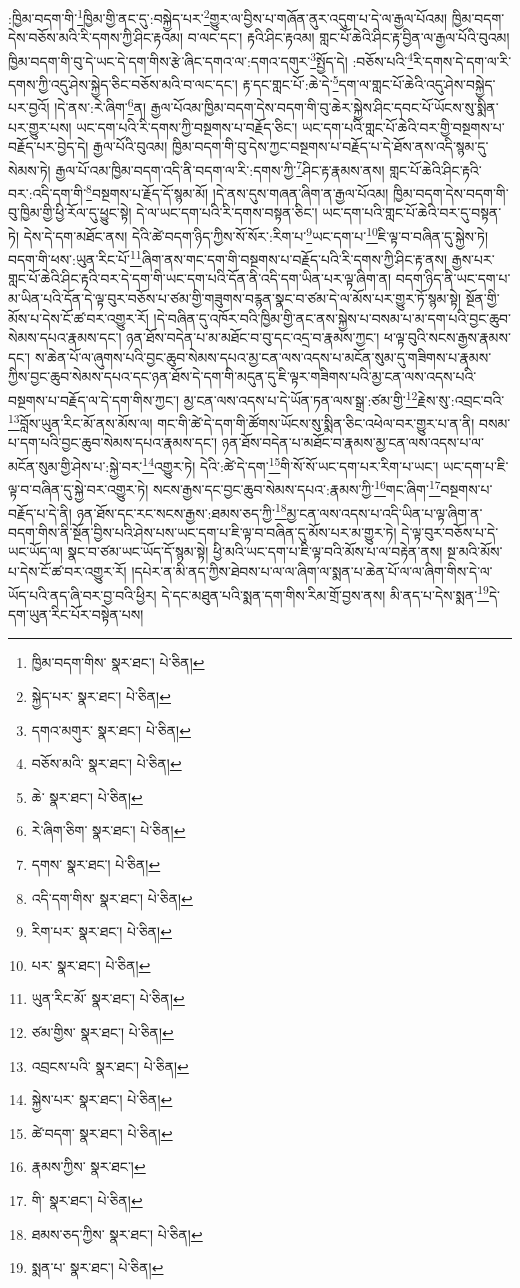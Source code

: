 :ཁྱིམ་བདག་གི་\footnote{ཁྱིམ་བདག་གིས་  སྣར་ཐང་།  པེ་ཅིན། }ཁྱིམ་གྱི་ནང་དུ་:བསྐྱེད་པར་\footnote{སྐྱེད་པར་  སྣར་ཐང་།  པེ་ཅིན། }གྱུར་ལ་བྱིས་པ་གཞོན་ནུར་འདུག་པ་དེ་ལ་རྒྱལ་པོའམ། ཁྱིམ་བདག་དེས་བཅོས་མའི་རི་དགས་ཀྱི་ཤིང་རྟའམ། བ་ལང་དང་། རྟའི་ཤིང་རྟའམ། གླང་པོ་ཆེའི་ཤིང་རྟ་བྱིན་ལ་རྒྱལ་པོའི་བུའམ། ཁྱིམ་བདག་གི་བུ་དེ་ཡང་དེ་དག་གིས་རྩེ་ཞིང་དགའ་ལ་:དགའ་དགུར་\footnote{དགའ་མགུར་  སྣར་ཐང་།  པེ་ཅིན། }སྤྱོད་དེ། :བཅོས་པའི་\footnote{བཅོས་མའི་  སྣར་ཐང་།  པེ་ཅིན། }རི་དགས་དེ་དག་ལ་རི་དགས་ཀྱི་འདུ་ཤེས་སྐྱེད་ཅིང་བཅོས་མའི་བ་ལང་དང་། རྟ་དང་གླང་པོ་:ཆེ་དེ་\footnote{ཆེ་  སྣར་ཐང་།  པེ་ཅིན། }དག་ལ་གླང་པོ་ཆེའི་འདུ་ཤེས་བསྐྱེད་པར་བྱའོ། །དེ་ནས་:རེ་ཞིག་\footnote{རེ་ཞིག་ཅིག་  སྣར་ཐང་།  པེ་ཅིན། }ན། རྒྱལ་པོའམ་ཁྱིམ་བདག་དེས་བདག་གི་བུ་ཆེར་སྐྱེས་ཤིང་དབང་པོ་ཡོངས་སུ་སྨིན་པར་གྱུར་པས། ཡང་དག་པའི་རི་དགས་ཀྱི་བསྔགས་པ་བརྗོད་ཅིང་། ཡང་དག་པའི་གླང་པོ་ཆེའི་བར་གྱི་བསྔགས་པ་བརྗོད་པར་བྱེད་དེ། རྒྱལ་པོའི་བུའམ། ཁྱིམ་བདག་གི་བུ་དེས་ཀྱང་བསྔགས་པ་བརྗོད་པ་དེ་ཐོས་ནས་འདི་སྙམ་དུ་སེམས་ཏེ། རྒྱལ་པོ་འམ་ཁྱིམ་བདག་འདི་ནི་བདག་ལ་རི་:དགས་ཀྱི་\footnote{དགས་  སྣར་ཐང་།  པེ་ཅིན། }ཤིང་རྟ་རྣམས་ནས། གླང་པོ་ཆེའི་ཤིང་རྟའི་བར་:འདི་དག་གི་\footnote{འདི་དག་གིས་  སྣར་ཐང་།  པེ་ཅིན། }བསྔགས་པ་རྗོད་དོ་སྙམ་མོ། །དེ་ནས་དུས་གཞན་ཞིག་ན་རྒྱལ་པོའམ། ཁྱིམ་བདག་དེས་བདག་གི་བུ་ཁྱིམ་གྱི་ཕྱི་རོལ་དུ་ཕྱུང་སྟེ། དེ་ལ་ཡང་དག་པའི་རི་དགས་བསྟན་ཅིང་། ཡང་དག་པའི་གླང་པོ་ཆེའི་བར་དུ་བསྟན་ཏེ། དེས་དེ་དག་མཐོང་ནས། དེའི་ཚེ་བདག་ཉིད་ཀྱིས་སོ་སོར་:རིག་པ་\footnote{རིག་པར་  སྣར་ཐང་།  པེ་ཅིན། }ཡང་དག་པ་\footnote{པར་  སྣར་ཐང་།  པེ་ཅིན། }ཇི་ལྟ་བ་བཞིན་དུ་སྐྱེས་ཏེ། བདག་གི་ཕས་:ཡུན་རིང་པོ་\footnote{ཡུན་རིང་མོ་  སྣར་ཐང་།  པེ་ཅིན། }ཞིག་ནས་གང་དག་གི་བསྔགས་པ་བརྗོད་པའི་རི་དགས་ཀྱི་ཤིང་རྟ་ནས། རྒྱས་པར་གླང་པོ་ཆེའི་ཤིང་རྟའི་བར་དེ་དག་གི་ཡང་དག་པའི་དོན་ནི་འདི་དག་ཡིན་པར་ལྟ་ཞིག་ན། བདག་ཉིད་ནི་ཡང་དག་པ་མ་ཡིན་པའི་དོན་དེ་ལྟ་བུར་བཅོས་པ་ཙམ་གྱི་གཟུགས་བརྙན་སྣང་བ་ཙམ་དེ་ལ་མོས་པར་གྱུར་ཏོ་སྙམ་སྟེ། སྔོན་གྱི་མོས་པ་དེས་ངོ་ཚ་བར་འགྱུར་རོ། །དེ་བཞིན་དུ་འཁོར་བའི་ཁྱིམ་གྱི་ནང་ནས་སྐྱེས་པ་བསམ་པ་མ་དག་པའི་བྱང་ཆུབ་སེམས་དཔའ་རྣམས་དང་། ཉན་ཐོས་བདེན་པ་མ་མཐོང་བ་བུ་དང་འདྲ་བ་རྣམས་ཀྱང་། ཕ་ལྟ་བུའི་སངས་རྒྱས་རྣམས་དང་། ས་ཆེན་པོ་ལ་ཞུགས་པའི་བྱང་ཆུབ་སེམས་དཔའ་མྱ་ངན་ལས་འདས་པ་མངོན་སུམ་དུ་གཟིགས་པ་རྣམས་ཀྱིས་བྱང་ཆུབ་སེམས་དཔའ་དང་ཉན་ཐོས་དེ་དག་གི་མདུན་དུ་ཇི་ལྟར་གཟིགས་པའི་མྱ་ངན་ལས་འདས་པའི་བསྔགས་པ་བརྗོད་ལ་དེ་དག་གིས་ཀྱང་། མྱ་ངན་ལས་འདས་པ་དེ་ཡོན་ཏན་ལས་སྒྲ་:ཙམ་གྱི་\footnote{ཙམ་གྱིས་  སྣར་ཐང་།  པེ་ཅིན། }རྗེས་སུ་:འབྲང་བའི་\footnote{འབྲངས་པའི་  སྣར་ཐང་།  པེ་ཅིན། }བློས་ཡུན་རིང་མོ་ནས་མོས་ལ། གང་གི་ཚེ་དེ་དག་གི་ཚོགས་ཡོངས་སུ་སྨིན་ཅིང་འཕེལ་བར་གྱུར་པ་ན་ནི། བསམ་པ་དག་པའི་བྱང་ཆུབ་སེམས་དཔའ་རྣམས་དང་། ཉན་ཐོས་བདེན་པ་མཐོང་བ་རྣམས་མྱ་ངན་ལས་འདས་པ་ལ་མངོན་སུམ་གྱི་ཤེས་པ་:སྐྱེ་བར་\footnote{སྐྱེས་པར་  སྣར་ཐང་།  པེ་ཅིན། }འགྱུར་ཏེ། དེའི་:ཚེ་དེ་དག་\footnote{ཚེ་བདག་  སྣར་ཐང་།  པེ་ཅིན། }གི་སོ་སོ་ཡང་དག་པར་རིག་པ་ཡང་། ཡང་དག་པ་ཇི་ལྟ་བ་བཞིན་དུ་སྐྱེ་བར་འགྱུར་ཏེ། སངས་རྒྱས་དང་བྱང་ཆུབ་སེམས་དཔའ་:རྣམས་ཀྱི་\footnote{རྣམས་ཀྱིས་  སྣར་ཐང་། }གང་ཞིག་\footnote{གི་  སྣར་ཐང་།  པེ་ཅིན། }བསྔགས་པ་བརྗོད་པ་དེ་ནི། ཉན་ཐོས་དང་རང་སངས་རྒྱས་:ཐམས་ཅད་ཀྱི་\footnote{ཐམས་ཅད་ཀྱིས་  སྣར་ཐང་།  པེ་ཅིན། }མྱ་ངན་ལས་འདས་པ་འདི་ཡིན་པ་ལྟ་ཞིག་ན་བདག་གིས་ནི་སྔོན་བྱིས་པའི་ཤེས་པས་ཡང་དག་པ་ཇི་ལྟ་བ་བཞིན་དུ་མོས་པར་མ་གྱུར་ཏེ། དེ་ལྟ་བུར་བཅོས་པ་དེ་ཡང་ཡོད་ལ། སྣང་བ་ཙམ་ཡང་ཡོད་དོ་སྙམ་སྟེ། ཕྱི་མའི་ཡང་དག་པ་ཇི་ལྟ་བའི་མོས་པ་ལ་བརྟེན་ནས། སྔ་མའི་མོས་པ་དེས་ངོ་ཚ་བར་འགྱུར་རོ། །དཔེར་ན་མི་ནད་ཀྱིས་ཐེབས་པ་ལ་ལ་ཞིག་ལ་སྨན་པ་ཆེན་པོ་ལ་ལ་ཞིག་གིས་དེ་ལ་ཡོད་པའི་ནད་ཞི་བར་བྱ་བའི་ཕྱིར། དེ་དང་མཐུན་པའི་སྨན་དག་གིས་རིམ་གྲོ་བྱས་ནས། མི་ནད་པ་དེས་སྨན་\footnote{སྨན་པ་  སྣར་ཐང་།  པེ་ཅིན། }དེ་དག་ཡུན་རིང་པོར་བསྟེན་པས། 